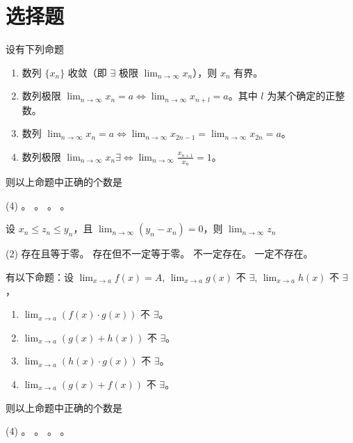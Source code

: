 \section{选择题}
\begin{ti}
	设有下列命题
	\begin{enumerate}
		\item 数列 $\{ x_n \}$ 收敛（即 $\exists$ 极限 $\lim_{n \to \infty} x_n$），则 $x_n$ 有界。
		\item 数列极限 $\lim_{n \to \infty} x_n = a \Leftrightarrow \lim_{n \to \infty} x_{n+l} = a$。其中 $l$ 为某个确定的正整数。
		\item 数列 $\lim_{n \to \infty} x_n = a \Leftrightarrow \lim_{n \to \infty} x_{2n-1} = \lim_{n \to \infty} x_{2n} = a$。
		\item 数列极限 $\lim_{n \to \infty} x_n \exists \Leftrightarrow \lim_{n \to \infty} \frac{x_{n+1}}{x_n} = 1$。
	\end{enumerate}
	则以上命题中正确的个数是
	\begin{tasks}(4)
		。
		。
		。
		。
	\end{tasks}
\end{ti}

\begin{ti}
	设 $x_n \leq z_n \leq y_n$，且 $\lim_{n \to \infty} (y_n - x_n) = 0$，则 $\lim_{n \to \infty} z_n$
	\begin{tasks}(2)
		\task 存在且等于零。
		\task 存在但不一定等于零。
		\task 不一定存在。
		\task 一定不存在。
	\end{tasks}
\end{ti}

\begin{ti}
	有以下命题：设 $\lim_{x \to a} f(x) = A$, $\lim_{x \to a} g(x)$ 不 $\exists$, $\lim_{x \to a} h(x)$ 不 $\exists$，
	\begin{enumerate}
		\item $\lim_{x \to a} (f(x) \cdot g(x))$ 不 $\exists$。
		\item $\lim_{x \to a} (g(x) + h(x))$ 不 $\exists$。
		\item $\lim_{x \to a} (h(x) \cdot g(x))$ 不 $\exists$。
		\item $\lim_{x \to a} (g(x) + f(x))$ 不 $\exists$。
	\end{enumerate}
	则以上命题中正确的个数是
	\begin{tasks}(4)
		。
		。
		。
		。
	\end{tasks}
\end{ti}


